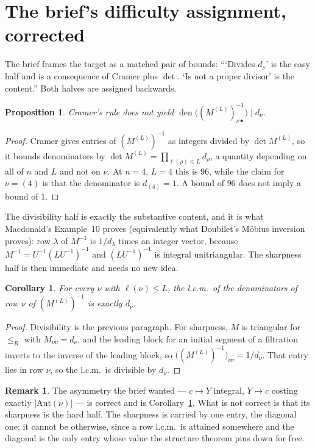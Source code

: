 \documentclass[11pt]{article}
\newtheorem{proposition}[theorem]{Proposition}
\newtheorem{corollary}[theorem]{Corollary}
\theoremstyle{definition}
\newtheorem{remark}[theorem]{Remark}
\newcommand{\lam}{\lambda}
\newcommand{\Aut}{\mathrm{Aut}}
\DeclareMathOperator{\den}{den}
\begin{document}
\section{The brief's difficulty assignment, corrected}

The brief frames the target as a matched pair of bounds: ```Divides $d_\nu$' is the easy half and is
a consequence of Cramer plus $\det$. `Is not a proper divisor' is the content.'' Both halves are
assigned backwards.

\begin{proposition}\label{prop:cramer}
Cramer's rule does not yield $\den\bigl((M^{(L)})^{-1}_{\nu\bullet}\bigr)\mid d_\nu$.
\end{proposition}

\begin{proof}
Cramer gives entries of $(M^{(L)})^{-1}$ as integers divided by $\det M^{(L)}$, so it bounds
denominators by $\det M^{(L)}=\prod_{\ell(\rho)\le L}d_\rho$, a quantity depending on all of $n$ and
$L$ and not on $\nu$. At $n=4$, $L=4$ this is $96$, while the claim for $\nu=(4)$ is that the
denominator is $d_{(4)}=1$. A bound of $96$ does not imply a bound of $1$.
\end{proof}

The divisibility half is exactly the substantive content, and it is what Macdonald's Example~10
proves (equivalently what Doubilet's Möbius inversion proves): row $\lam$ of $M^{-1}$ is
$1/d_\lam$ times an integer vector, because $M^{-1}=U^{-1}(LU^{-1})^{-1}$ and $(LU^{-1})^{-1}$ is
integral unitriangular. The sharpness half is then immediate and needs no new idea.

\begin{corollary}\label{cor:row}
For every $\nu$ with $\ell(\nu)\le L$, the l.c.m.\ of the denominators of row $\nu$ of
$(M^{(L)})^{-1}$ is exactly $d_\nu$.
\end{corollary}

\begin{proof}
Divisibility is the previous paragraph. For sharpness, $M$ is triangular for $\le_R$ with
$M_{\nu\nu}=d_\nu$, and the leading block for an initial segment of a filtration inverts to the
inverse of the leading block, so $\bigl((M^{(L)})^{-1}\bigr)_{\nu\nu}=1/d_\nu$. That entry lies in
row $\nu$, so the l.c.m.\ is divisible by $d_\nu$.
\end{proof}

\begin{remark}
The asymmetry the brief wanted --- $c\mapsto Y$ integral, $Y\mapsto c$ costing exactly
$|\Aut(\nu)|$ --- is correct and is Corollary~\ref{cor:row}. What is not correct is that its
sharpness is the hard half. The sharpness is carried by one entry, the diagonal one; it cannot be
otherwise, since a row l.c.m.\ is attained somewhere and the diagonal is the only entry whose
value the structure theorem pins down for free.
\end{remark}
\end{document}
